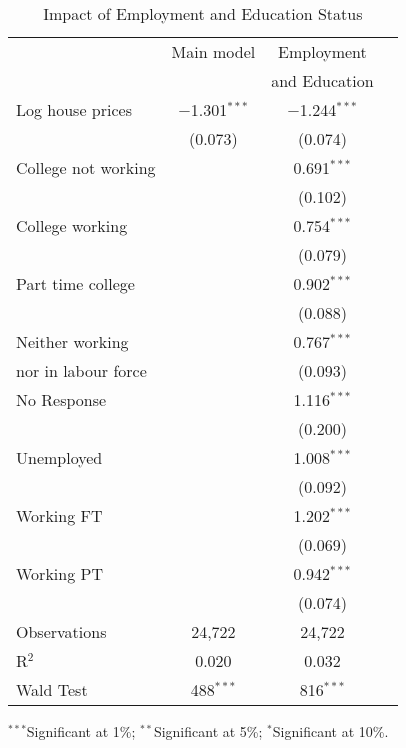 \documentclass[12pt]{article}
\begin{document}
\begin{table}[htbp] \centering
  \begin{threeparttable}
    \caption{Impact of Employment and Education Status}
    \label{empEdu}
    \tabularnewline
    \begin{tabular}{@{\extracolsep{1pt}}lccc}
      \toprule
       & Main model & Employment \\
       &  & and Education \\
      \midrule
      Log house prices & $-$1.301$^{***}$ & $-$1.244$^{***}$ \\
       & (0.073) & (0.074) \\
    \addlinespace[0.5em]
      College not working &  & 0.691$^{***}$ \\
       &  & (0.102) \\
    \addlinespace[0.5em]
      College working &  & 0.754$^{***}$ \\
       &  & (0.079) \\
    \addlinespace[0.5em]
      Part time college &  & 0.902$^{***}$ \\
       &  & (0.088) \\
    \addlinespace[0.5em]
      Neither working &  & 0.767$^{***}$ \\
      nor in labour force &  & (0.093) \\
    \addlinespace[0.5em]
      No Response &  & 1.116$^{***}$ \\
       &  & (0.200) \\
    \addlinespace[0.5em]
      Unemployed &  & 1.008$^{***}$ \\
       &  & (0.092) \\
    \addlinespace[0.5em]
      Working FT &  & 1.202$^{***}$ \\
       &  & (0.069) \\
    \addlinespace[0.5em]
      Working PT &  & 0.942$^{***}$ \\
       &  & (0.074) \\
    \addlinespace[0.5em]
     Observations & 24,722 & 24,722 \\
     R$^{2}$ & 0.020 & 0.032 \\
     Wald Test & 488$^{***}$ & 816$^{***}$ \\
    \bottomrule
    \end{tabular}
    \begin{tablenotes}[flushleft]
        \item $^{***}$Significant at 1\%; $^{**}$Significant at 5\%; $^{*}$Significant at 10\%.
    \end{tablenotes}
  \end{threeparttable}
\end{table}
\end{document}

